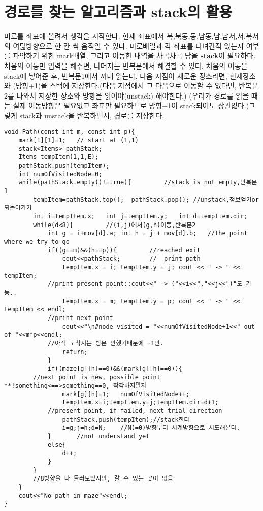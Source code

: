 \documentclass[a4paper,11pt]{article}
\begin{document}
\section{경로를 찾는 알고리즘과 stack의 활용}
\quad 미로를 좌표에 올려서 생각을 시작한다. 현재 좌표에서 북,북동,동,남동,남,남서,서,북서의 여덟방향으로 한 칸 씩 움직일 수 있다. 미로배열과 각 좌표를 다녀간적 있는지 여부를 파악하기 위한 mark배열, 그리고 이동한 내역을 차곡차곡 담을 \textbf{stack}이 필요하다. 처음의 이동만 입력을 해주면, 나머지는 반복문에서 해결할 수 있다.  처음의 이동을 stack에 넣어준 후, 반복문1에서 꺼내 읽는다. 다음 지점이 새로운 장소라면, 현재장소와 (방향+1)을 스택에 저장한다.(다음 지점에서 그 다음으로 이동할 수 없다면, 반복문2를 나와서 저장한 장소와 방향을 읽어야(unstack) 해야한다.) (우리가 경로를 읽을 때는 실제 이동방향은 필요없고 좌표만 필요하므로 방향+1이 stack되어도 상관없다.)그렇게 stack과 unstack을 반복하면서, 경로를 저장한다. 
\begin{Verbatim}
void Path(const int m, const int p){
    mark[1][1]=1;   // start at (1,1)
    stack<Items> pathStack; 
    Items tempItem(1,1,E);  
    pathStack.push(tempItem);
    int numOfVisitedNode=0;   
    while(pathStack.empty()!=true){         //stack is not empty,반복문1
        tempItem=pathStack.top();  pathStack.pop(); //unstack,정보얻기or되돌아가기
        int i=tempItem.x;   int j=tempItem.y;   int d=tempItem.dir;
        while(d<8){         //(i,j)에서(g,h)이동,반복문2
            int g = i+mov[d].a; int h = j + mov[d].b;   //the point where we try to go
            if((g==m)&&(h==p)){         //reached exit
                cout<<pathStack;        //  print path
                tempItem.x = i; tempItem.y = j; cout << " -> " << tempItem;     
			//print present point::cout<<" -> ("<<i<<","<<j<<")"도 가능..
                tempItem.x = m; tempItem.y = p; cout << " -> " << tempItem << endl;     
			//print next point
                cout<<"\n#node visited = "<<numOfVisitedNode+1<<" out of "<<m*p<<endl;  
			//아직 도착지는 방문 안했기때문에 +1만.
                return;
            }
            if((maze[g][h]==0)&&(mark[g][h]==0)){ 
		//next point is new, possible point **!something<==>something==0, 착각하지말자
                mark[g][h]=1;   numOfVisitedNode++;
                tempItem.x=i;tempItem.y=j;tempItem.dir=d+1;
			//present point, if failed, next trial direction
                pathStack.push(tempItem);//stack한다
                i=g;j=h;d=N;    //N(=0)방향부터 시계방향으로 시도해본다.
            }       //not understand yet
            else{
                d++;   
            }
        }
        //8방향을 다 둘러보았지만, 갈 수 있는 곳이 없음
    }
    cout<<"No path in maze"<<endl; 
}\end{Verbatim}
\end{document}
